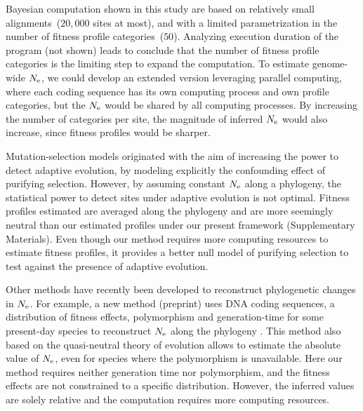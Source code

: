 Bayesian computation shown in this study are based on relatively small alignments~($20,000$ sites at most), and with a limited parametrization in the number of fitness profile categories~($50$).
Analyzing execution duration of the program (not shown) leads to conclude that the number of fitness profile categories is the limiting step to expand the computation.
To estimate genome-wide $N_{\mathrm{e}}$, we could develop an extended version leveraging parallel computing, where each coding sequence has its own computing process and own profile categories, but the $N_{\mathrm{e}}$ would be shared by all computing processes.
By increasing the number of categories per site, the magnitude of inferred $N_{\mathrm{e}}$ would also increase, since fitness profiles would be sharper.

Mutation-selection models originated with the aim of increasing the power to detect adaptive evolution, by modeling explicitly the confounding effect of purifying selection.
However, by assuming constant $N_{\mathrm{e}}$ along a phylogeny, the statistical power to detect sites under adaptive evolution is not optimal.
Fitness profiles estimated are averaged along the phylogeny and are more seemingly neutral than our estimated profiles under our present framework (Supplementary Materials).
Even though our method requires more computing resources to estimate fitness profiles, it provides a better null model of purifying selection to test against the presence of adaptive evolution.

Other methods have recently been developed to reconstruct phylogenetic changes in $N_{\mathrm{e}}$.
For example, a new method (preprint) uses DNA coding sequences, a distribution of fitness effects, polymorphism and generation-time for some present-day species to reconstruct $N_{\mathrm{e}}$ along the phylogeny \citep{Brevet2019}.
This method also based on the quasi-neutral theory of evolution allows to estimate the absolute value of $N_{\mathrm{e}}$, even for species where the polymorphism is unavailable.
Here our method requires neither generation time nor polymorphism, and the fitness effects are not constrained to a specific distribution.
However, the inferred values are solely relative and the computation requires more computing resources.


